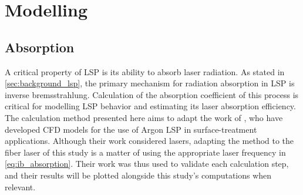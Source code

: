 \chapter{Modelling} \label{chp:models}
    

    \section{Absorption} \label{sec:models_absorption}
        A critical property of LSP is its ability to absorb laser radiation. As stated in \autoref{sec:background_lsp}, the primary mechanism for radiation absorption in LSP is inverse bremsstrahlung. Calculation of the absorption coefficient of this process is critical for modelling LSP behavior and estimating its laser absorption efficiency. The calculation method presented here aims to adapt the work of \textcite{akarapuNumericalModelLasersustained2009,nassarInvestigationLasersustainedPlasma2012}, who have developed CFD models for the use of Argon LSP in surface-treatment applications. Although their work considered  lasers, adapting the method to the fiber laser of this study is a matter of using the appropriate laser frequency in \autoref{eq:ib_absorption}. Their work was thus used to validate each calculation step, and their results will be plotted alongside this study's computations when relevant.
        
